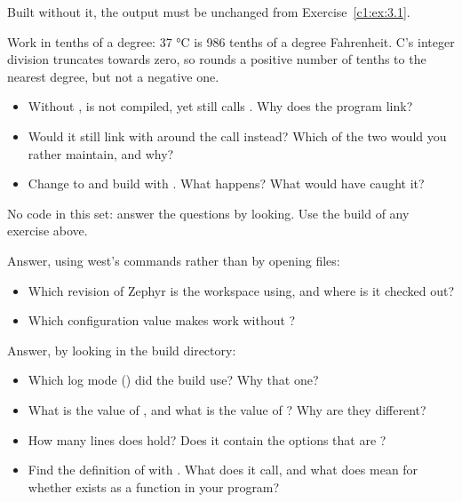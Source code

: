 \noindent Built without it, the output must be unchanged from Exercise~\ref{c1:ex:3.1}.

\note[Hint] Work in tenths of a degree: 37 °C is 986 tenths of a degree Fahrenheit. C’s integer
division truncates towards zero, so  rounds a positive number of tenths to
the nearest degree, but not a negative one.

\begin{itemize}
  \item Without ,  is not compiled, yet  still calls
    . Why does the program link?
  \item Would it still link with  around the call instead? Which of the
    two would you rather maintain, and why?
  \item Change  to  and build
    with . What happens? What would have caught it?
\end{itemize}

\label{c1:set:4}
No code in this set: answer the questions by looking. Use the build of any exercise above.

\label{c1:ex:4.1}

Answer, using west’s commands rather than by opening files:

\begin{itemize}
  \item Which revision of Zephyr is the workspace using, and where is it checked out?
  \item Which configuration value makes  work without ?
\end{itemize}

\label{c1:ex:4.2}

Answer, by looking in the build directory:

\begin{itemize}
  \item Which log mode () did the  build use? Why that one?
  \item What is the value of , and what is the value of ? Why
    are they different?
  \item How many  lines does  hold? Does it contain the options that are
    ?
  \item Find the definition of  with . What does it call, and what does  mean for
    whether  exists as a function in your program?
\end{itemize}

